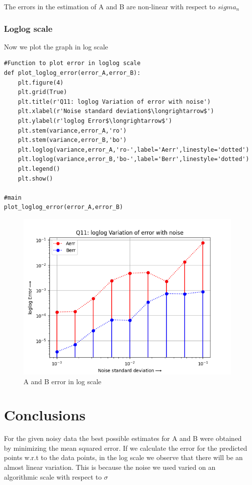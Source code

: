\documentclass[11pt, a4paper]{article}
\begin{document}
The errors in the estimation of A and B are non-linear with respect to $sigma_{n}$

\subsubsection{Loglog scale}
Now we plot the graph in log scale
\begin{lstlisting}
#Function to plot error in loglog scale
def plot_loglog_error(error_A,error_B):
	plt.figure(4)
	plt.grid(True)
	plt.title(r'Q11: loglog Variation of error with noise')
	plt.xlabel(r'Noise standard deviation$\longrightarrow$')
	plt.ylabel(r'loglog Error$\longrightarrow$')
	plt.stem(variance,error_A,'ro')
	plt.stem(variance,error_B,'bo')
	plt.loglog(variance,error_A,'ro-',label='Aerr',linestyle='dotted')
	plt.loglog(variance,error_B,'bo-',label='Berr',linestyle='dotted')
	plt.legend()
	plt.show()

#main
plot_loglog_error(error_A,error_B)
\end{lstlisting}



\begin{figure}[!tbh]
   	\centering
   	\includegraphics[scale=0.7]{Q11.png}  %
   	\caption{A and B error in log scale}
   	\label{fig:A and B err in log scale}
\end{figure}
   
\newpage


\section{Conclusions}
For the given noisy data the best possible estimates for A and B were obtained by minimizing the mean squared error. If we calculate the error for the predicted points w.r.t to the data points, in the log scale we observe that there will be an almost linear variation. This is because the noise we used varied on an algorithmic scale with respect to $\sigma$

 
\end{document}
